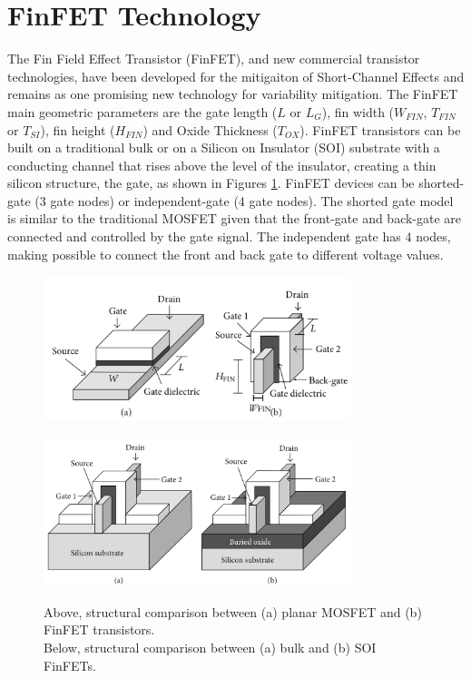 \documentclass[pgmicro,diss,english]{iiufrgs}
\begin{document}
\section{FinFET Technology}

The Fin Field Effect Transistor (FinFET), and new commercial transistor technologies, have been developed for the mitigaiton of Short-Channel Effects and remains as one promising new technology for variability mitigation. The FinFET main geometric parameters are the gate length ($L$ or $L_G$), fin width ($W_{FIN}$, $T_{FIN}$ or $T_{SI}$), fin height ($H_{FIN}$) and Oxide Thickness ($T_{OX}$). FinFET transistors can be built on a traditional bulk or on a Silicon on Insulator (SOI) substrate with a conducting channel that rises above the level of the insulator, creating a thin silicon structure, the gate, as shown in Figures \ref{finfet}. FinFET devices can be shorted-gate (3 gate nodes) or independent-gate (4 gate nodes). The shorted gate model is similar to the traditional MOSFET given that the front-gate and back-gate are connected and controlled by the gate signal. The independent gate has 4 nodes, making possible to connect the front and back gate to different voltage values.

    \begin{figure} [t]
        \centering
	\includegraphics[width=0.8\textwidth, trim={0 0 0 0},clip]{finfet.pdf}
        \caption{Above, structural comparison between (a) planar MOSFET and (b) FinFET transistors. \\
		Below, structural comparison between (a) bulk and (b) SOI FinFETs.}

        \centering
        \includegraphics[width=0.8\textwidth, trim={0 0 0 0},clip]{finfet2.png}
        \label{finfet}
    \end{figure}
\end{document}
